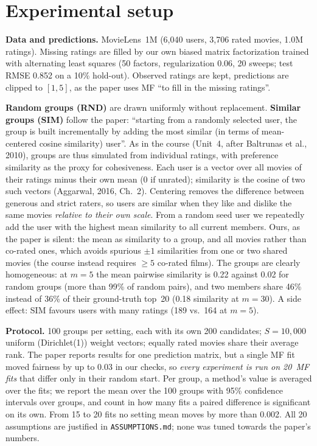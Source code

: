 \documentclass[11pt,a4paper]{article}
\begin{document}
\section{Experimental setup}

\textbf{Data and predictions.} MovieLens~1M (6{,}040 users, 3{,}706 rated
movies, 1.0M ratings). Missing ratings are filled by our own biased matrix
factorization trained with alternating least squares (50 factors,
regularization 0.06, 20 sweeps; test RMSE 0.852 on a 10\% hold-out).
Observed ratings are kept, predictions are clipped to $[1,5]$, as the paper
uses MF ``to fill in the missing ratings''.

\textbf{Random groups (RND)} are drawn uniformly without replacement.
\textbf{Similar groups (SIM)} follow the paper: ``starting from a randomly
selected user, the group is built incrementally by adding the most similar (in
terms of mean-centered cosine similarity) user''. As in the course (Unit~4,
after Baltrunas et al., 2010), groups are thus simulated from individual
ratings, with preference similarity as the proxy for cohesiveness. Each user
is a vector over all movies of their ratings minus their own mean (0 if
unrated); similarity is the cosine of two such vectors (Aggarwal, 2016,
Ch.~2). Centering removes the difference between generous and strict raters,
so users are similar when they like and dislike the same movies
\emph{relative to their own scale}. From a random seed user we repeatedly add
the user with the highest mean similarity to all current members. Ours, as
the paper is silent: the mean as similarity to a group, and all movies rather
than co-rated ones, which avoids spurious $\pm1$ similarities from one or two
shared movies (the course instead requires $\ge5$ co-rated films). The groups
are clearly homogeneous: at $m=5$ the mean pairwise similarity is 0.22 against
0.02 for random groups (more than 99\% of random pairs), and two members share
46\% instead of 36\% of their ground-truth top~20 (0.18 similarity at $m=30$).
A side effect: SIM favours users with many ratings (189 vs.\ 164 at $m=5$).

\textbf{Protocol.} 100 groups per setting, each with its own 200 candidates;
$S=10{,}000$ uniform (Dirichlet(1)) weight vectors; equally rated movies share
their average rank. The paper reports results for one prediction matrix, but
a single MF fit moved fairness by up to 0.03 in our checks, so \emph{every
experiment is run on 20~MF fits} that differ only in their random start. Per
group, a method's value is averaged over the fits; we report the mean over the
100 groups with 95\% confidence intervals over groups, and count in how many
fits a paired difference is significant on its own. From 15 to 20 fits no
setting mean moves by more than 0.002. All 20 assumptions are justified in
\texttt{ASSUMPTIONS.md}; none was tuned towards the paper's numbers.
\end{document}

